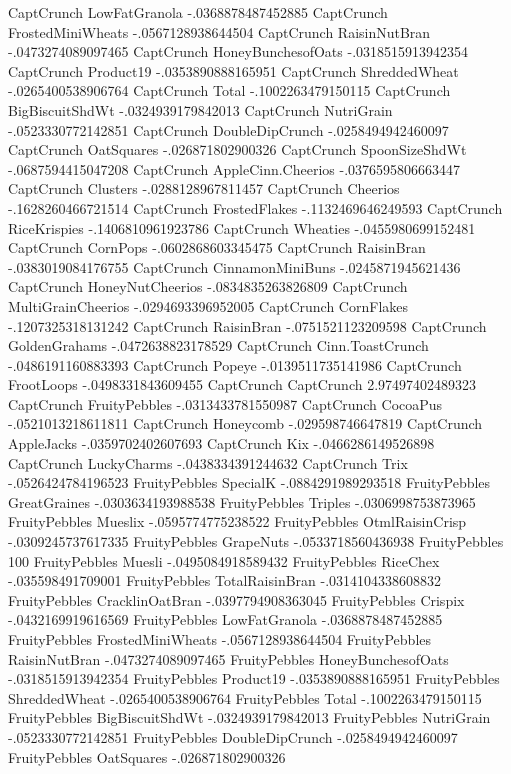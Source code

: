 CaptCrunch	LowFatGranola	-.0368878487452885
CaptCrunch	FrostedMiniWheats	-.0567128938644504
CaptCrunch	RaisinNutBran	-.0473274089097465
CaptCrunch	HoneyBunchesofOats	-.0318515913942354
CaptCrunch	Product19	-.0353890888165951
CaptCrunch	ShreddedWheat	-.0265400538906764
CaptCrunch	Total	-.1002263479150115
CaptCrunch	BigBiscuitShdWt	-.0324939179842013
CaptCrunch	NutriGrain	-.0523330772142851
CaptCrunch	DoubleDipCrunch	-.0258494942460097
CaptCrunch	OatSquares	-.026871802900326
CaptCrunch	SpoonSizeShdWt	-.0687594415047208
CaptCrunch	AppleCinn.Cheerios	-.0376595806663447
CaptCrunch	Clusters	-.0288128967811457
CaptCrunch	Cheerios	-.1628260466721514
CaptCrunch	FrostedFlakes	-.1132469646249593
CaptCrunch	RiceKrispies	-.1406810961923786
CaptCrunch	Wheaties	-.0455980699152481
CaptCrunch	CornPops	-.0602868603345475
CaptCrunch	RaisinBran	-.0383019084176755
CaptCrunch	CinnamonMiniBuns	-.0245871945621436
CaptCrunch	HoneyNutCheerios	-.0834835263826809
CaptCrunch	MultiGrainCheerios	-.0294693396952005
CaptCrunch	CornFlakes	-.1207325318131242
CaptCrunch	RaisinBran	-.0751521123209598
CaptCrunch	GoldenGrahams	-.0472638823178529
CaptCrunch	Cinn.ToastCrunch	-.0486191160883393
CaptCrunch	Popeye	-.0139511735141986
CaptCrunch	FrootLoops	-.0498331843609455
CaptCrunch	CaptCrunch	2.97497402489323
CaptCrunch	FruityPebbles	-.0313433781550987
CaptCrunch	CocoaPus	-.0521013218611811
CaptCrunch	Honeycomb	-.029598746647819
CaptCrunch	AppleJacks	-.0359702402607693
CaptCrunch	Kix	-.0466286149526898
CaptCrunch	LuckyCharms	-.0438334391244632
CaptCrunch	Trix	-.0526424784196523
FruityPebbles	SpecialK	-.0884291989293518
FruityPebbles	GreatGraines	-.0303634193988538
FruityPebbles	Triples	-.0306998753873965
FruityPebbles	Mueslix	-.0595774775238522
FruityPebbles	OtmlRaisinCrisp	-.0309245737617335
FruityPebbles	GrapeNuts	-.0533718560436938
FruityPebbles	100%
FruityPebbles	Muesli	-.0495084918589432
FruityPebbles	RiceChex	-.035598491709001
FruityPebbles	TotalRaisinBran	-.0314104338608832
FruityPebbles	CracklinOatBran	-.0397794908363045
FruityPebbles	Crispix	-.0432169919616569
FruityPebbles	LowFatGranola	-.0368878487452885
FruityPebbles	FrostedMiniWheats	-.0567128938644504
FruityPebbles	RaisinNutBran	-.0473274089097465
FruityPebbles	HoneyBunchesofOats	-.0318515913942354
FruityPebbles	Product19	-.0353890888165951
FruityPebbles	ShreddedWheat	-.0265400538906764
FruityPebbles	Total	-.1002263479150115
FruityPebbles	BigBiscuitShdWt	-.0324939179842013
FruityPebbles	NutriGrain	-.0523330772142851
FruityPebbles	DoubleDipCrunch	-.0258494942460097
FruityPebbles	OatSquares	-.026871802900326
